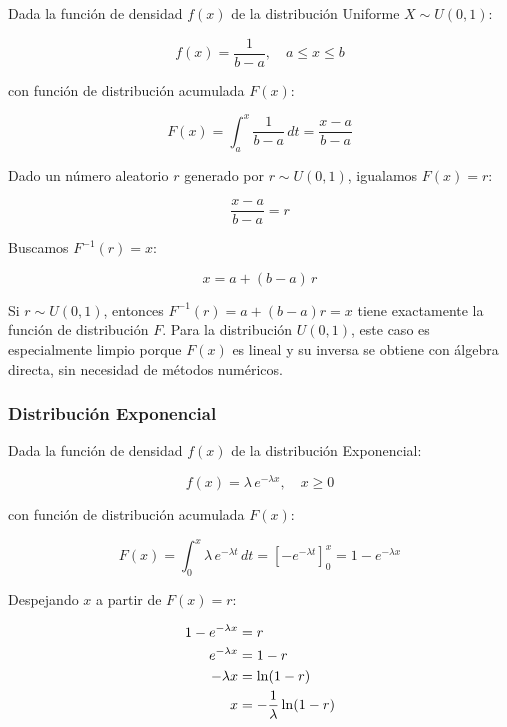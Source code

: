 \documentclass{article}
\begin{document}
Dada la función de densidad $f(x)$ de la distribución Uniforme $X \sim U(0, 1)$:

\begin{equation}
    f(x) = \frac{1}{b - a}, \quad a \leq x \leq b
\end{equation}

con función de distribución acumulada $F(x)$:

\begin{equation}
    F(x) = \int_a^x \frac{1}{b-a}\, dt = \frac{x - a}{b - a}
\end{equation}

Dado un número aleatorio $r$ generado por $r \sim U(0, 1)$, igualamos $F(x) = r$:

\begin{equation}
    \frac{x - a}{b - a} = r
\end{equation}

Buscamos $F^{-1}(r) = x$:

\begin{equation}
    x = a + (b - a)\,r
\end{equation}

Si $r \sim U(0,1)$, entonces $F^{-1}(r) = a + (b-a)r = x$ tiene exactamente la función de
distribución $F$. Para la distribución $U(0,1)$, este caso es especialmente limpio porque
$F(x)$ es lineal y su inversa se obtiene con álgebra directa, sin necesidad de métodos
numéricos.


\subsubsection{Distribución Exponencial}

Dada la función de densidad $f(x)$ de la distribución Exponencial:

\begin{equation}
    f(x) = \lambda\, e^{-\lambda x}, \quad x \geq 0
\end{equation}

con función de distribución acumulada $F(x)$:

\begin{equation}
    F(x) = \int_0^x \lambda\, e^{-\lambda t}\, dt = \left[-e^{-\lambda t}\right]_0^x = 1 - e^{-\lambda x}
\end{equation}

Despejando $x$ a partir de $F(x) = r$:

\begin{align}
    1 - e^{-\lambda x} &= r \notag \\
    e^{-\lambda x}     &= 1 - r \notag \\
    -\lambda x         &= \ln(1 - r) \notag \\
    x                  &= -\frac{1}{\lambda}\ln(1 - r)
\end{align}
\end{document}
